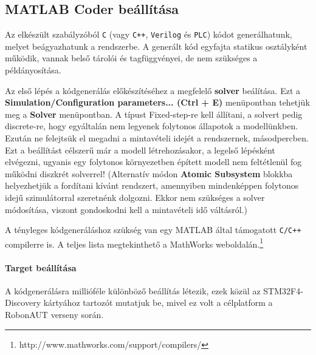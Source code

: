 \subsection{MATLAB Coder beállítása}

Az elkészült szabályzóból \verb!C! (vagy \verb!C++!, \verb!Verilog! és \verb!PLC!) kódot generálhatunk, melyet beágyazhatunk a rendszerbe. A generált kód egyfajta statikus osztályként működik, vannak belső tárolói és tagfüggvényei, de nem szükséges a példányosítása.

Az első lépés a kódgenerálás előkészítéséhez a megfelelő \textbf{solver} beálítása. Ezt a \textbf{Simulation/Configuration parameters... (Ctrl + E)} menüpontban tehetjük meg a \textbf{Solver} menüpontban. A típust Fixed-step-re kell állítani, a solvert pedig discrete-re, hogy egyáltalán nem legyenek folytonos állapotok a modellünkben. Ezután ne felejtsük el megadni a mintavételi idejét a rendszernek, másodpercben.
Ezt a beállítást célszerű már a modell létrehozásakor, a legelső lépésként elvégezni, ugyanis egy folytonos környezetben épített modell nem feltétlenül fog működni diszkrét solverrel! (Alternatív módon \textbf{Atomic Subsystem} blokkba helyezhetjük a fordítani kívánt rendszert, amennyiben mindenképpen folytonos idejű szimulátorral szeretnénk dolgozni. Ekkor nem szükséges a solver módosítása, viszont gondoskodni kell a mintavételi idő váltásról.)

A tényleges kódgeneráláshoz szükség van egy MATLAB által támogatott \verb!C/C++! compilerre is. A teljes lista megtekinthető a MathWorks weboldalán.\footnote{http://www.mathworks.com/support/compilers/}

\paragraph{Target beállítása}

A kódgenerálásra millióféle különböző beállítás létezik, ezek közül az STM32F4-Discovery kártyához tartozót mutatjuk be, mivel ez volt a célplatform a RobonAUT verseny során.


